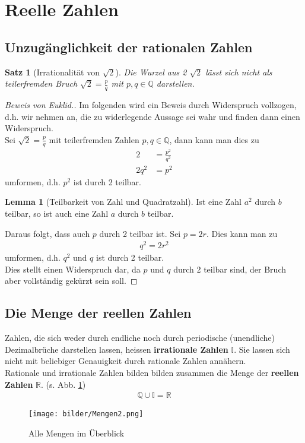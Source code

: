 \documentclass{report}
\newtheorem {satz}{Satz}
\newcommand{\R}{\mathbb{R}}
\theoremstyle{definition}
\theoremstyle{definition}
\theoremstyle{an}
\theoremstyle{lem}
\newtheorem{lemma}{Lemma}[section]
\theoremstyle{def}
\theoremstyle{def}
\begin{document}
	\section{Reelle Zahlen}
	\subsection{Unzugänglichkeit der rationalen Zahlen}
	\begin{satz}[Irrationalität von $\sqrt{2}$]
		Die Wurzel aus 2 $\sqrt{2}$ lässt sich nicht als teilerfremden Bruch $\sqrt{2}=\frac{p}{q}$ mit $p,q\in \mathbb{Q}$ darstellen.
	\end{satz}
	\begin{proof}[Beweis von Euklid.]
		Im folgenden wird ein Beweis durch Widerspruch vollzogen, d.h. wir nehmen an, die zu widerlegende Aussage sei wahr und finden dann einen Widerspruch.\\
		Sei $\sqrt{2}=\frac{p}{q}$ mit teilerfremden Zahlen $p,q\in \mathbb {Q}$, dann kann man dies zu 
		\begin{align}
			2&=\frac{p^2}{q^2} \\
			2q^2&=p^2
		\end{align} umformen, d.h. $p^2$ ist durch 2 teilbar.
		\begin{lemma}[Teilbarkeit von Zahl und Quadratzahl]
			Ist eine Zahl $a^2$ durch $b$ teilbar, so ist auch eine Zahl $a$ durch $b$ teilbar.
		\end{lemma}
		
	 Daraus folgt, dass auch $p$ durch 2 teilbar ist. Sei $p=2r$. Dies kann man zu 
	 \begin{align}
	 	q^2=2r^2
	 \end{align}
 	umformen, d.h. $q^2$ und $q$ ist durch 2 teilbar.\\
 	Dies stellt einen Widerspruch dar, da $p$ und $q$ durch 2 teilbar sind, der Bruch aber vollständig gekürzt sein soll.
 \end{proof}
 	\subsection{Die Menge der reellen Zahlen}
 	\begin{defi}
 		Zahlen, die sich weder durch endliche noch durch periodische (unendliche) Dezimalbrüche darstellen lassen, heissen \textbf{irrationale Zahlen} $\mathbb{I}$. Sie lassen sich nicht mit beliebiger Genauigkeit durch rationale Zahlen annähern. \\
 		Rationale und irrationale Zahlen bilden bilden zusammen die Menge der \textbf{reellen Zahlen} $\R$. (s. Abb. \ref{fig:mengen}) 
 		\begin{align}
 			\mathbb{Q} \cup \mathbb{I}=\R
 		\end{align}
 	\end{defi}
	\begin{figure}[h]
			\centering
			\texttt{[image: bilder/Mengen2.png]}
			\caption[Alle Mengen im Überblick]{Alle Mengen im Überblick}
			\label{fig:mengen}
	\end{figure}
\end{document}

